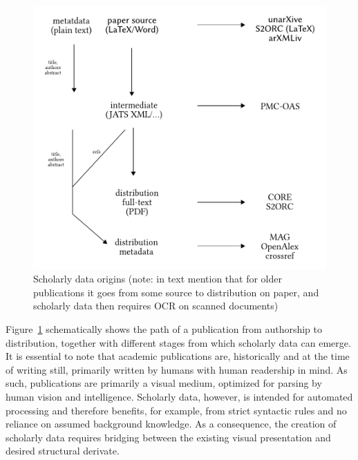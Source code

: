 \begin{figure}[bt]
  \centering
  \includegraphics[width=0.7\linewidth]{figures/foundations/scholarly_data_lifecycle_dummy}
  \caption[Scholarly data origins]{Scholarly data origins (note: in text mention that for older publications it goes from some source to distribution on paper, and scholarly data then requires OCR on scanned documents)}
  \label{fig:foundations-datalifecycle}
\end{figure}


Figure~\ref{fig:foundations-datalifecycle} schematically shows the path of a publication from authorship to distribution, together with different stages from which scholarly data can emerge. It is essential to note that academic publications are, historically and at the time of writing still, primarily written by humans with human readership in mind. As such, publications are primarily a visual medium, optimized for parsing by human vision and intelligence. Scholarly data, however, is intended for automated processing and therefore benefits, for example, from strict syntactic rules and no reliance on assumed background knowledge. As a consequence, the creation of scholarly data requires bridging between the existing visual presentation and desired structural derivate.

